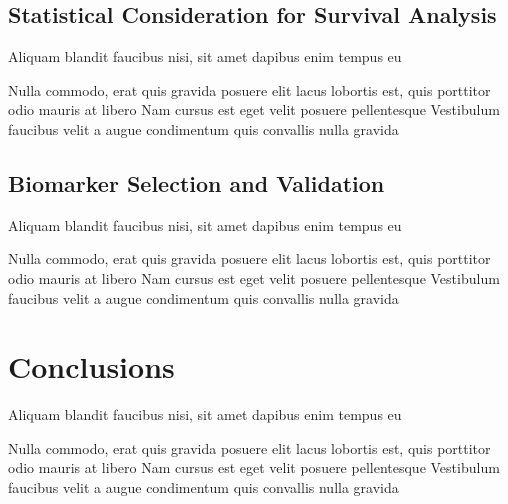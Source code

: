 \documentclass[
paper=landscape,
paper=160mm:90mm, %
fontsize=11pt, %
pagesize, %
parskip=half-, %
]{scrartcl} %
\theoremstyle{mythmstyle} %
\begin{document}
\clearpage

\subsection{Statistical Consideration for Survival Analysis}

\begin{outline}

\1 Aliquam blandit faucibus nisi, sit amet dapibus enim tempus eu

\2 Nulla commodo, erat quis gravida posuere
\1 elit lacus lobortis est, quis porttitor odio mauris at libero
\1 Nam cursus est eget velit posuere pellentesque
\1 Vestibulum faucibus velit a augue condimentum quis convallis nulla gravida

\end{outline}


\clearpage

\subsection{Biomarker Selection and Validation}


\begin{outline}

\1 Aliquam blandit faucibus nisi, sit amet dapibus enim tempus eu

\2 Nulla commodo, erat quis gravida posuere
\1 elit lacus lobortis est, quis porttitor odio mauris at libero
\1 Nam cursus est eget velit posuere pellentesque
\1 Vestibulum faucibus velit a augue condimentum quis convallis nulla gravida

\end{outline}


\clearpage


\section*{Conclusions} %


\begin{outline}

\1 Aliquam blandit faucibus nisi, sit amet dapibus enim tempus eu

\2 Nulla commodo, erat quis gravida posuere
\1 elit lacus lobortis est, quis porttitor odio mauris at libero
\1 Nam cursus est eget velit posuere pellentesque
\1 Vestibulum faucibus velit a augue condimentum quis convallis nulla gravida

\end{outline}
\end{document}
